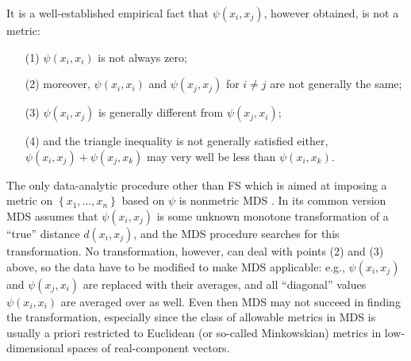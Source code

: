 \documentclass[nojss]{jss}
\begin{document}
It is a well-established empirical fact that $\psi\left(x_{i},x_{j}\right)$,
however obtained, is not a metric:
\begin{itemize}
\item [(1)] $\psi\left(x_{i},x_{i}\right)$ is not always zero;
\item [(2)] moreover, $\psi\left(x_{i},x_{i}\right)$ and $\psi\left(x_{j},x_{j}\right)$
for $i\neq j$ are not generally the same;
\item [(3)] $\psi\left(x_{i},x_{j}\right)$ is generally different from
$\psi\left(x_{j},x_{i}\right)$;
\item [(4)] and the triangle inequality is not generally satisfied either,
$\psi\left(x_{i},x_{j}\right)+\psi\left(x_{j},x_{k}\right)$ may very
well be less than $\psi\left(x_{i},x_{k}\right)$.
\end{itemize}
The only data-analytic procedure other than FS which is aimed at imposing
a metric on $\left\{ x_{1},\ldots,x_{n}\right\} $ based on $\psi$
is nonmetric MDS \citep[e.g.,][]{KruskWish1978}. 
In its common version MDS assumes that $\psi\left(x_{i},x_{j}\right)$
is some unknown monotone transformation of a ``true'' distance
$d\left(x_{i},x_{j}\right)$, and the MDS procedure searches for this
transformation. No transformation, however, can deal with points (2)
and (3) above, so the data have to be modified to make MDS applicable:
e.g., $\psi\left(x_{i},x_{j}\right)$ and $\psi\left(x_{j},x_{i}\right)$
are replaced with their averages, and all ``diagonal'' values
$\psi\left(x_{i},x_{i}\right)$ are averaged over as well. Even then
MDS may not succeed in finding the transformation, 
especially since the class of allowable metrics in MDS is usually a priori
restricted to Euclidean (or so-called Minkowskian) metrics in low-dimensional
spaces of real-component vectors.
\end{document}
